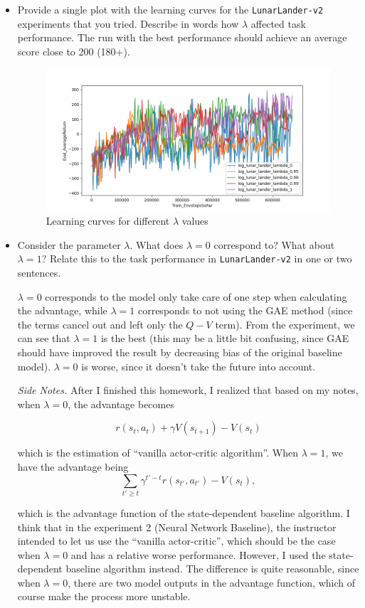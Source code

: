 \documentclass{article}
\begin{document}
\begin{itemize}
        \item Provide a single plot with the learning curves for the \verb|LunarLander-v2| experiments that you tried. Describe in words how $\lambda$ affected task performance. The run with the best performance should achieve an average score close to 200 (180+).

\MYSOLUTION

\begin{figure}[H]
        \centering
        \includegraphics[width=0.9\linewidth]{./report/assets/E3_all.png} %
        \caption{Learning curves for different $\lambda$ values}
        \label{fig:E3}
\end{figure}
        \item Consider the parameter $\lambda$. What does $\lambda = 0$ correspond to? What about $\lambda = 1$? Relate this to the task performance in \verb|LunarLander-v2| in one or two sentences.
        
\MYSOLUTION

$\lambda=0$ corresponds to the model only take care of one step when calculating the advantage, while $\lambda=1$ corresponds to not using the GAE method (since the terms cancel out and left only the $Q-V$ term). From the experiment, we can see that $\lambda=1$ is the best (this may be a little bit confusing, since GAE should have improved the result by decreasing bias of the original baseline model). $\lambda=0$ is worse, since it doesn't take the future into account.

\textit{Side Notes.} After I finished this homework, I realized that based on my notes, when $\lambda=0$, the advantage becomes

\[
r(s_t,a_t)+\gamma V(s_{t+1})-V(s_t)
\]

which is the estimation of ``vanilla actor-critic algorithm''. When $\lambda=1$, we have the advantage being
\[
\sum_{t'\ge t}\gamma^{t'-t}r(s_{t'},a_{t'})-V(s_t),
\]

which is the advantage function of the state-dependent baseline algorithm. I think that in the experiment 2 (Neural Network Baseline), the instructor intended to let us use the ``vanilla actor-critic'', which should be the case when $\lambda=0$ and has a relative worse performance. However, I used the state-dependent baseline algorithm instead. The difference is quite reasonable, since when $\lambda=0$, there are two model outputs in the advantage function, which of course make the process more unstable.

\end{itemize}
\end{document}
